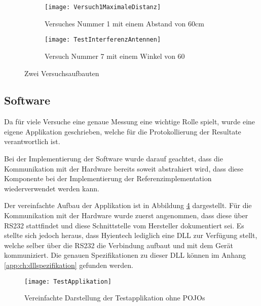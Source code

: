 \begin{figure}[htb]
	\begin{subfigure}{.5\linewidth}
		\texttt{[image: Versuch1MaximaleDistanz]}
		\caption{Versuches Nummer 1 mit einem Abstand von 60cm}
		\label{fig:versuchaufbaunmr1}
	\end{subfigure}\hfill%
	\begin{subfigure}{.35\linewidth}
		\centering
		\texttt{[image: TestInterferenzAntennen]}
		\caption{Versuch Nummer 7 mit einem Winkel von 60\SIUnitSymbolDegree}
		\label{fig:versuchaufbaunmr7}
	\end{subfigure}
	\caption{Zwei Versuchsaufbauten}
	\label{fig:versuchsaufbauten}
\end{figure}


\subsection{Software}
Da für viele Versuche eine genaue Messung eine wichtige Rolle spielt, wurde eine eigene Applikation geschrieben, welche für die Protokollierung der Resultate verantwortlich ist.

Bei der Implementierung der Software wurde darauf geachtet, dass die Kommunikation mit der Hardware bereits soweit abstrahiert wird, dass diese Komponente bei der Implementierung der Referenzimplementation wiederverwendet werden kann.

Der vereinfachte Aufbau der Applikation ist in Abbildung \ref{fig:test_applikation_aufbau} dargestellt. Für die Kommunikation mit der Hardware wurde zuerst angenommen, dass diese über RS232 stattfindet und diese Schnittstelle vom Hersteller dokumentiert sei. Es stellte sich jedoch heraus, dass Hyientech lediglich eine DLL zur Verfügung stellt, welche selber über die RS232 die Verbindung aufbaut und mit dem Gerät kommuniziert. Die genauen Spezifikationen zu dieser DLL können im Anhang \ref{app:ch:dllspezifikation} gefunden werden.

\begin{figure}[htb]
	\centering
	\texttt{[image: TestApplikation]}
	\caption{Vereinfachte Darstellung der Testapplikation ohne POJOs}
	\label{fig:test_applikation_aufbau}
\end{figure}
 
